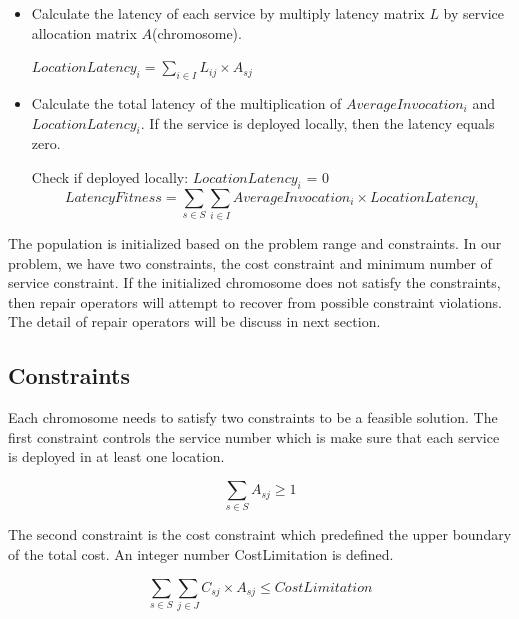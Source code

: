 \documentclass{llncs}
\begin{document}
\begin{itemize}
\begin{itemize}
			\item Calculate the latency of each service by multiply latency matrix $L$ by service allocation matrix $A$(chromosome).
				\begin{center}
					$LocationLatency_{i} = \sum\limits_{i \in I} L_{ij} \times A_{sj}$
				\end{center}

			\item Calculate the total latency of the multiplication of $AverageInvocation_{i}$ and $LocationLatency_{i}$.
				If the service is deployed locally, then the latency equals zero.
				\begin{center}
						Check if deployed locally: $LocationLatency_{i}$ = 0
				\begin{equation}
						LatencyFitness = \sum\limits_{s \in S}\sum\limits_{i \in I} AverageInvocation_{i} \times LocationLatency_{i}
				\end{equation}
				\end{center}
		\end{itemize}
\end{itemize}
The population is initialized based on the problem range and constraints. 
In our problem, we have two constraints, the cost constraint and minimum number of service constraint. 
If the initialized chromosome does not satisfy the constraints, then repair operators will attempt to 
recover from possible constraint violations. The detail of repair operators will be discuss in next section.
\subsection{Constraints}
Each chromosome needs to satisfy two constraints to be a feasible solution.
The first constraint controls the service number which is make sure that each service is deployed in at 
least one location.
\begin{center}
	\begin{equation}
		\sum\limits_{s \in S} A_{sj} \geq 1
	\end{equation}
\end{center}

The second constraint is the cost constraint which predefined the upper boundary of the total cost.
An integer number CostLimitation is defined.
\begin{center}
	\begin{equation}
		\sum\limits_{s \in S} \sum\limits_{j \in J} C_{sj} \times A_{sj} \leq CostLimitation
	\end{equation}
\end{center}
\end{document}
